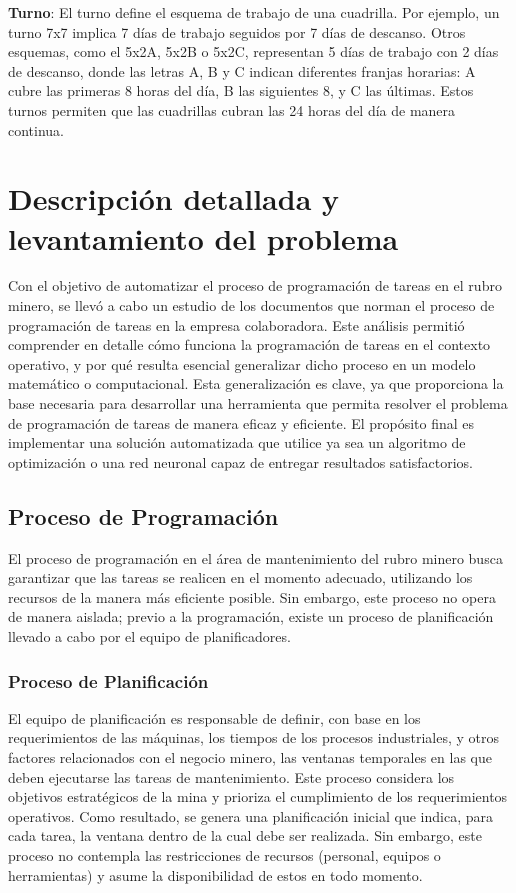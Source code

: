 \documentclass{article}
\begin{document}
\textbf{Turno}: El turno define el esquema de trabajo de una cuadrilla. Por ejemplo, un turno 7x7 implica 7 días de trabajo seguidos por 7 días de descanso. Otros esquemas, como el 5x2A, 5x2B o 5x2C, representan 5 días de trabajo con 2 días de descanso, donde las letras A, B y C indican diferentes franjas horarias: A cubre las primeras 8 horas del día, B las siguientes 8, y C las últimas. Estos turnos permiten que las cuadrillas cubran las 24 horas del día de manera continua.


\section{Descripción detallada y levantamiento del problema}
Con el objetivo de automatizar el proceso de programación de tareas en el rubro minero, se llevó a cabo un estudio de los documentos que norman el proceso de programación de tareas en la empresa colaboradora. Este análisis permitió comprender en detalle cómo funciona la programación de tareas en el contexto operativo, y por qué resulta esencial generalizar dicho proceso en un modelo matemático o computacional. Esta generalización es clave, ya que proporciona la base necesaria para desarrollar una herramienta que permita resolver el problema de programación de tareas de manera eficaz y eficiente. El propósito final es implementar una solución automatizada que utilice ya sea un algoritmo de optimización o una red neuronal capaz de entregar resultados satisfactorios.

\subsection{Proceso de Programación}

El proceso de programación en el área de mantenimiento del rubro minero busca garantizar que las tareas se realicen en el momento adecuado, utilizando los recursos de la manera más eficiente posible. Sin embargo, este proceso no opera de manera aislada; previo a la programación, existe un proceso de planificación llevado a cabo por el equipo de planificadores.

\subsubsection{Proceso de Planificación}

El equipo de planificación es responsable de definir, con base en los requerimientos de las máquinas, los tiempos de los procesos industriales, y otros factores relacionados con el negocio minero, las ventanas temporales en las que deben ejecutarse las tareas de mantenimiento. Este proceso considera los objetivos estratégicos de la mina y prioriza el cumplimiento de los requerimientos operativos. Como resultado, se genera una planificación inicial que indica, para cada tarea, la ventana dentro de la cual debe ser realizada. Sin embargo, este proceso no contempla las restricciones de recursos (personal, equipos o herramientas) y asume la disponibilidad de estos en todo momento.
\end{document}
